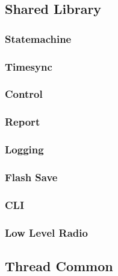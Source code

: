 



\subsection{Shared Library}\label{subsec:SharedLibrary}

\subsubsection{Statemachine}\label{subsubsec:Statemachine}

\subsubsection{Timesync}\label{subsubsec:Timesync}

\subsubsection{Control}\label{subsubsec:Control}

\subsubsection{Report}\label{subsubsec:Report}

\subsubsection{Logging}\label{subsubsec:Logging}

\subsubsection{Flash Save}\label{subsubsec:FlashSave}

\subsubsection{CLI}\label{subsubsec:CLI}

\subsubsection{Low Level Radio}\label{subsubsec:LowLevelRadio}



\subsection{Thread Common}\label{subsec:ThreadCommon}

